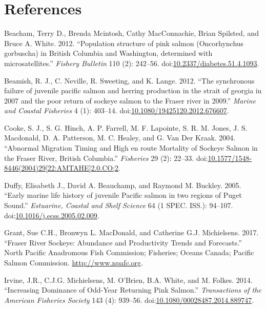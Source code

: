 \documentclass[fleqn,10pt]{wlpeerj} %
\begin{document}
\section*{References}\label{references}

\hypertarget{refs}{}
\hypertarget{ref-Beacham2012}{}
Beacham, Terry D., Brenda Mcintosh, Cathy MacConnachie, Brian Spilsted,
and Bruce A. White. 2012. ``Population structure of pink salmon
(Oncorhynchus gorbuscha) in British Columbia and Washington, determined
with microsatellites.'' \emph{Fishery Bulletin} 110 (2): 242--56.
doi:\href{https://doi.org/10.2337/diabetes.51.4.1093}{10.2337/diabetes.51.4.1093}.

\hypertarget{ref-Beamish2012}{}
Beamish, R. J., C. Neville, R. Sweeting, and K. Lange. 2012. ``The
synchronous failure of juvenile pacific salmon and herring production in
the strait of georgia in 2007 and the poor return of sockeye salmon to
the Fraser river in 2009.'' \emph{Marine and Coastal Fisheries} 4 (1):
403--14.
doi:\href{https://doi.org/10.1080/19425120.2012.676607}{10.1080/19425120.2012.676607}.

\hypertarget{ref-Cooke2004}{}
Cooke, S. J., S. G. Hinch, A. P. Farrell, M. F. Lapointe, S. R. M.
Jones, J. S. Macdonald, D. A. Patterson, M. C. Healey, and G. Van Der
Kraak. 2004. ``Abnormal Migration Timing and High en route Mortality of
Sockeye Salmon in the Fraser River, British Columbia.'' \emph{Fisheries}
29 (2): 22--33.
doi:\href{https://doi.org/10.1577/1548-8446(2004)29\%5B22:AMTAHE\%5D2.0.CO;2}{10.1577/1548-8446(2004)29{[}22:AMTAHE{]}2.0.CO;2}.

\hypertarget{ref-Duffy2005}{}
Duffy, Elisabeth J., David A. Beauchamp, and Raymond M. Buckley. 2005.
``Early marine life history of juvenile Pacific salmon in two regions of
Puget Sound.'' \emph{Estuarine, Coastal and Shelf Science} 64 (1 SPEC.
ISS.): 94--107.
doi:\href{https://doi.org/10.1016/j.ecss.2005.02.009}{10.1016/j.ecss.2005.02.009}.

\hypertarget{ref-Grant2017}{}
Grant, Sue C.H., Bronwyn L. MacDonald, and Catherine G.J. Michielsens.
2017. ``Fraser River Sockeye: Abundance and Productivity Trends and
Forecasts.'' North Pacific Anadromous Fish Commission; Fisheries; Oceans
Canada; Pacific Salmon Commission. \url{http://www.npafc.org}.

\hypertarget{ref-Irvine2014}{}
Irvine, J.R., C.J.G. Michielsens, M. O'Brien, B.A. White, and M. Folkes.
2014. ``Increasing Dominance of Odd-Year Returning Pink Salmon.''
\emph{Transactions of the American Fisheries Society} 143 (4): 939--56.
doi:\href{https://doi.org/10.1080/00028487.2014.889747}{10.1080/00028487.2014.889747}.
\end{document}
